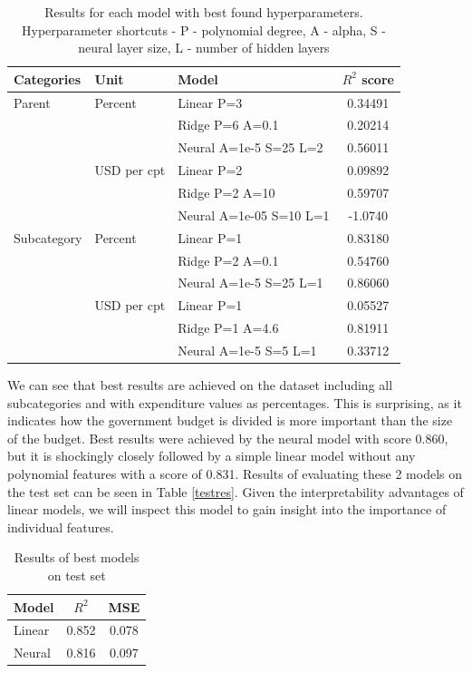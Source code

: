 \documentclass{article}
\begin{document}
\begin{table}[h]
\centering
\begin{tabular}{|l|l|l|c|} \toprule
Categories & Unit & Model & \(R^2\) score \\ \midrule
Parent & Percent & Linear P=3 & 0.34491 \\ \cline{3-4}
&  & Ridge P=6 A=0.1 & 0.20214 \\ \cline{3-4}
&  & Neural A=1e-5 S=25 L=2 & 0.56011 \\ \cline{2-4}
& USD per cpt & Linear P=2 & 0.09892 \\ \cline{3-4}
&  & Ridge P=2 A=10 & 0.59707 \\ \cline{3-4}
&  & Neural A=1e-05 S=10 L=1 & -1.0740 \\ \cline{1-4}
Subcategory & Percent & Linear P=1 & 0.83180 \\ \cline{3-4}
&  & Ridge P=2 A=0.1& 0.54760 \\ \cline{3-4}
&  & Neural A=1e-5 S=25 L=1 & 0.86060 \\ \cline{2-4}
& USD per cpt & Linear  P=1 & 0.05527 \\ \cline{3-4}
&  & Ridge P=1 A=4.6 & 0.81911 \\ \cline{3-4}
&  & Neural A=1e-5 S=5 L=1 & 0.33712 \\ \bottomrule
\end{tabular}
\caption{Results for each model with best found hyperparameters. Hyperparameter shortcuts - P - polynomial degree, A - alpha, S - neural layer size, L - number of hidden layers}
\label{tab:results}
\end{table}


We can see that best results are achieved on the dataset including all subcategories and with expenditure values as percentages. This is surprising, as it indicates how the government budget is divided is more important than the size of the budget. Best results were achieved by the neural model with score 0.860, but it is shockingly closely followed by a simple linear model without any polynomial features with a score of 0.831. Results of evaluating these 2 models on the test set can be seen in Table \ref{testres}. Given the interpretability advantages of linear models, we will inspect this model to gain insight into the importance of individual features. 

\begin{table}[h]
\centering
\begin{tabular}{|l|c|c|} \toprule
Model & \(R^2\) & MSE \\ \midrule
Linear & 0.852 & 0.078 \\ \cline{1-3}
Neural & 0.816 & 0.097 \\ \cline{1-3}
\end{tabular}
\caption{Results of best models on test set}
\label{tab:testres}
\end{table}
\end{document}
